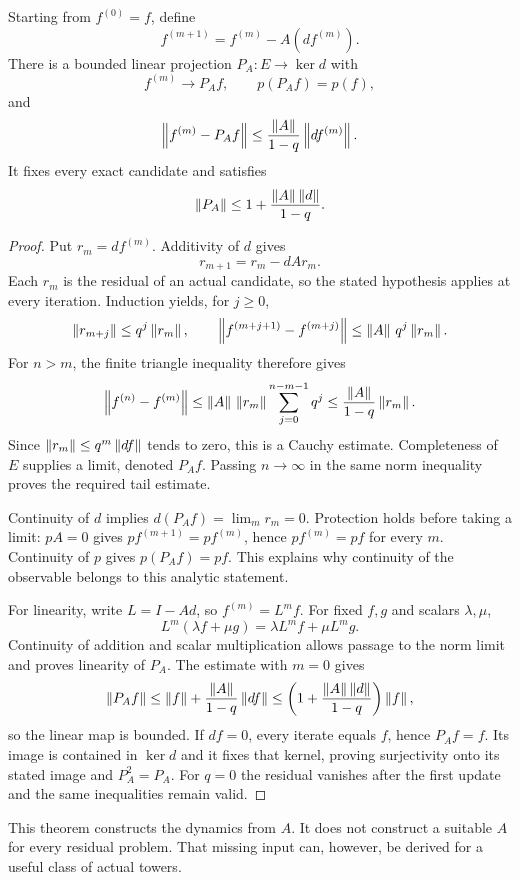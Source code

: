 \begin{theorem}\label{KS19}
Starting from \(f^{(0)}=f\), define
\[
 f^{(m+1)}=f^{(m)}-A(df^{(m)}).
\]
There is a bounded linear projection \(P_A:E\to\ker d\) with
\[
 f^{(m)}\longrightarrow P_Af,\qquad p(P_Af)=p(f),
\]
and
\[
 \left\lVert f^{(m)}-P_Af\right\rVert
 \le\frac{\left\lVert A\right\rVert}{1-q}\left\lVert df^{(m)}\right\rVert.
\]
It fixes every exact candidate and satisfies
\[
 \left\lVert P_A\right\rVert\le1+\frac{\left\lVert A\right\rVert\left\lVert d\right\rVert}{1-q}.
\]
\end{theorem}
\begin{proof}
Put $r_m=df^{(m)}$. Additivity of $d$ gives
\[
 r_{m+1}=r_m-dAr_m.
\]
Each $r_m$ is the residual of an actual candidate, so the stated hypothesis applies at every iteration. Induction yields, for $j\ge0$,
\[
 \left\lVert r_{m+j}\right\rVert\le q^j\left\lVert r_m\right\rVert,\qquad
 \left\lVert f^{(m+j+1)}-f^{(m+j)}\right\rVert
 \le\left\lVert A\right\rVert\,q^j\left\lVert r_m\right\rVert.
\]
For $n>m$, the finite triangle inequality therefore gives
\[
 \left\lVert f^{(n)}-f^{(m)}\right\rVert
 \le\left\lVert A\right\rVert\,\left\lVert r_m\right\rVert\sum_{j=0}^{n-m-1}q^j
 \le\frac{\left\lVert A\right\rVert}{1-q}\left\lVert r_m\right\rVert.
\]
Since $\left\lVert r_m\right\rVert\le q^m\left\lVert df\right\rVert$ tends to zero, this is a Cauchy estimate. Completeness of $E$ supplies a limit, denoted $P_Af$. Passing $n\to\infty$ in the same norm inequality proves the required tail estimate.

Continuity of $d$ implies $d(P_Af)=\lim_m r_m=0$. Protection holds before taking a limit: $pA=0$ gives $pf^{(m+1)}=pf^{(m)}$, hence $pf^{(m)}=pf$ for every $m$. Continuity of $p$ gives $p(P_Af)=pf$. This explains why continuity of the observable belongs to this analytic statement.

For linearity, write $L=I-Ad$, so $f^{(m)}=L^mf$. For fixed $f,g$ and scalars $\lambda,\mu$,
\[
 L^m(\lambda f+\mu g)=\lambda L^mf+\mu L^mg.
\]
Continuity of addition and scalar multiplication allows passage to the norm limit and proves linearity of $P_A$. The estimate with $m=0$ gives
\[
 \left\lVert P_Af\right\rVert\le\left\lVert f\right\rVert+\frac{\left\lVert A\right\rVert}{1-q}\left\lVert df\right\rVert
 \le\left(1+\frac{\left\lVert A\right\rVert\left\lVert d\right\rVert}{1-q}\right)\left\lVert f\right\rVert,
\]
so the linear map is bounded. If $df=0$, every iterate equals $f$, hence $P_Af=f$. Its image is contained in $\ker d$ and it fixes that kernel, proving surjectivity onto its stated image and $P_A^2=P_A$. For $q=0$ the residual vanishes after the first update and the same inequalities remain valid.
\end{proof}
This theorem constructs the dynamics from \(A\). It does not construct a suitable \(A\) for every residual problem. That missing input can, however, be derived for a useful class of actual towers.

